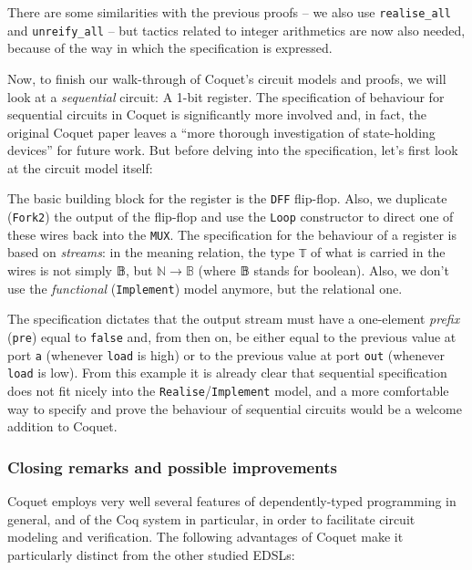             There are some similarities with the previous proofs -- we also use
            \texttt{realise\_all} and \texttt{unreify\_all} -- but tactics related to integer
            arithmetics are now also needed, because of the way in which the specification is
            expressed.

            Now, to finish our walk-through of Coquet's circuit models and proofs, we will look at a
            \emph{sequential} circuit: A 1-bit register. The specification of behaviour for
            sequential circuits in Coquet is significantly more involved and, in fact, the original
            Coquet paper\cite{coquet2011} leaves a ``more thorough investigation of state-holding
            devices'' for future work. But before delving into the specification, let's first look
            at the circuit model itself:


            The basic building block for the register is the \texttt{DFF} flip-flop. Also, we
            duplicate (\texttt{Fork2}) the output of the flip-flop and use the \texttt{Loop}
            constructor to direct one of these wires back into the \texttt{MUX}. The specification
            for the behaviour of a register is based on \emph{streams}: in the meaning relation, the
            type \texttt{𝕋} of what is carried in the wires is not simply 𝔹, but $ ℕ \rightarrow 𝔹 $
            (where 𝔹 stands for boolean). Also, we don't use the \emph{functional}
            (\texttt{Implement}) model anymore, but the relational one.


            The specification dictates that the output stream must have a one-element \emph{prefix}
            (\texttt{pre}) equal to \texttt{false} and, from then on, be either equal to the previous
            value at port \texttt{a} (whenever \texttt{load} is high) or to the previous value at
            port \texttt{out} (whenever \texttt{load} is low). From this example it is already clear
            that sequential specification does not fit nicely into the
            \texttt{Realise}/\texttt{Implement} model, and a more comfortable way to specify and
            prove the behaviour of sequential circuits would be a welcome addition to Coquet.


        \subsubsection{Closing remarks and possible improvements}
        \label{subsubsec:coquet-improv}
            Coquet employs very well several features of dependently-typed programming in general,
            and of the Coq system in particular, in order to facilitate circuit modeling and
            verification. The following advantages of Coquet make it particularly distinct from
            the other studied EDSLs:

